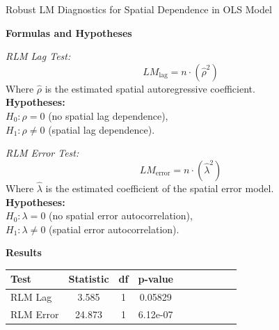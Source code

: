 \documentclass[10pt]{beamer}
\begin{document}
\begin{frame}{Robust LM Diagnostics for Spatial Dependence in OLS Model \parencites{anselin1988}}

\renewcommand{\arraystretch}{1.5}
\scriptsize

\textbf{Formulas and Hypotheses}

\textit{RLM Lag Test:}
\[ LM_{\text{lag}} = n \cdot (\hat{\rho}^2) \]
Where $\hat{\rho}$ is the estimated spatial autoregressive coefficient. \\
\textbf{Hypotheses:} \\
$H_0: \rho = 0$ (no spatial lag dependence), \\
$H_1: \rho \neq 0$ (spatial lag dependence).

\vspace{1em} %

\textit{RLM Error Test:}
\[ LM_{\text{error}} = n \cdot (\hat{\lambda}^2) \]
Where $\hat{\lambda}$ is the estimated coefficient of the spatial error model. \\
\textbf{Hypotheses:} \\
$H_0: \lambda = 0$ (no spatial error autocorrelation), \\
$H_1: \lambda \neq 0$ (spatial error autocorrelation).

\vspace{1em} %

\textbf{Results}
\begin{tabular}{@{}lccccccccc@{}}
\hline
\textbf{Test} & \textbf{Statistic} & \textbf{df} & \textbf{p-value} \\ 
\hline
RLM Lag & 3.585 & 1 & 0.05829 \\
RLM Error & 24.873 & 1 & 6.12e-07 \\
\hline
\end{tabular}
\vspace{-5mm} %
\end{frame}
\end{document}
